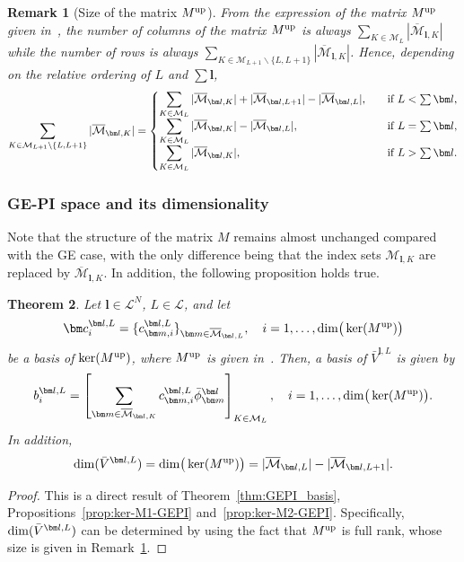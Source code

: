 \documentclass{article}
\newcommand{\bphi}[2]{\bar\phi^{#1}_{#2}}
\newcommand{\bV}{{\bar V}}
\newcommand{\card}[1]{|{#1}|}
\newcommand{\dimpi}[2]{\dim(\bV^{#1,#2})}
\newtheorem{theorem}{Theorem}[section]
\newtheorem{remark}[theorem]{Remark}
\numberwithin{equation}{section}
\def\bc{{\bm c}}
\def\bl{{\bm l}}
\def\bbm{{\bm m}}
\def\calM{\mathcal{M}}
\def\calL{\mathcal{L}}
\def\oMlK{\overline{\calM}_{\bl,K}}
\def\MlL{{M}}
\def\dim{{{\rm dim}}}
\def\Mup{{\MlL}^{\textup{up}}}
\begin{document}
\begin{remark}[Size of the matrix $\Mup$]\label{remark:size-M2-GEPI}
From the expression of the matrix $\Mup$ given in~, 
the number of columns of the matrix $\Mup$ is always 
$\displaystyle\sum_{K\in\calM_L}\card{\oMlK}$
while the number of rows is always 
$\sum_{K\in\calM_{L+1} \backslash \{ L, L+1\}}\card{\oMlK}$. 
Hence, depending on the relative ordering of $L$ and $\sum\bl$, 
\begin{equation*}
    \displaystyle\sum_{K\in\calM_{L+1} \backslash \{ L, L+1\}}\card{\oMlK} = 
    \begin{cases}
    \displaystyle {\sum_{K\in\calM_L}\card{\oMlK}} + \card{\overline{\calM}_{\bl,L+1}}-\card{\overline{\calM}_{\bl,L}}, & \quad \textup{if }L<\sum\bl, \\
    \displaystyle \sum_{K\in\calM_L}\card{\oMlK}-\card{\overline{\calM}_{\bl,L}}, & \quad \textup{if }L=\sum\bl, \\
    \displaystyle \sum_{K\in\calM_L}\card{\oMlK}, & \quad \textup{if }L>\sum\bl.
\end{cases}
\end{equation*}
\end{remark}

\subsubsection{GE-PI space and its dimensionality}
Note that the structure of the matrix $M$ remains almost unchanged compared with the GE case, with the only difference being that the index sets $\calM_{\bl,K}$ are replaced by $\oMlK$. 
In addition, the following proposition holds true.

\begin{theorem}\label{thm:gepi-su2}
Let $\bl\in\calL^N$, $L \in \calL$, and let
\[
    \bc^{\bl,L}_i = \{c_{\bbm,i}^{\bl,L}\}_{\bbm\in\overline{\calM}_{\bl,L}},\quad i=1,\ldots,\dim\big(\ker(\Mup)\big)
\]
be a basis of $\ker(\Mup)$, where $\Mup$ is given in~.
Then, a basis of $\bV^{\bl,L}$
is given by 
\begin{equation*}
     b^{\bl,L}_i = 
    \left[
        \sum_{\bbm \in \oMlK}c_{\bbm,i}^{\bl,L}
        \bphi{\bl}{\bbm}
    \right]_{K\in\calM_L},\quad i=1,\ldots,\dim\big(\ker(\Mup)\big).
\end{equation*}
In addition,
\begin{equation}\label{eq:dim_su2_pi}
    \dimpi{\bl}{L}=\dim\big(\ker(\Mup)\big)=\card{\overline{\calM}_{\bl,L}} - \card{\overline{\calM}_{\bl,L+1}}.
\end{equation}
\end{theorem}
\begin{proof}
This is a direct result of Theorem~\ref{thm:GEPI_basis}, Propositions~\ref{prop:ker-M1-GEPI} and~\ref{prop:ker-M2-GEPI}. Specifically, $\dimpi{\bl}{L}$ can be determined by using the fact that $\Mup$ is full rank, whose size is given in Remark~\ref{remark:size-M2-GEPI}.
\end{proof}
\end{document}
